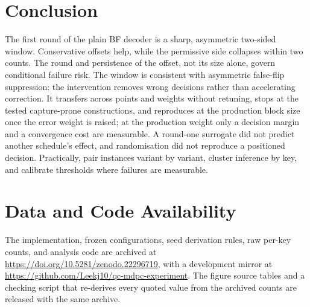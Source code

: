 \documentclass[lettersize,journal,onecolumn]{IEEEtran}
\begin{document}
\section{Conclusion}\label{sec:conclusion}

The first round of the plain BF decoder is a sharp, asymmetric two-sided window. Conservative offsets help, while the permissive side collapses within two counts. The round and persistence of the offset, not its size alone, govern conditional failure risk. The window is consistent with asymmetric false-flip suppression: the intervention removes wrong decisions rather than accelerating correction. It transfers across points and weights without retuning, stops at the tested capture-prone constructions, and reproduces at the production block size once the error weight is raised; at the production weight only a decision margin and a convergence cost are measurable. A round-one surrogate did not predict another schedule's effect, and randomisation did not reproduce a positioned decision. Practically, pair instances variant by variant, cluster inference by key, and calibrate thresholds where failures are measurable.
\section*{Data and Code Availability}
The implementation, frozen configurations, seed derivation rules, raw per-key counts, and analysis code are archived at \url{https://doi.org/10.5281/zenodo.22296719}, with a development mirror at \url{https://github.com/Leekj10/qc-mdpc-experiment}. The figure source tables and a checking script that re-derives every quoted value from the archived counts are released with the same archive.



\end{document}
